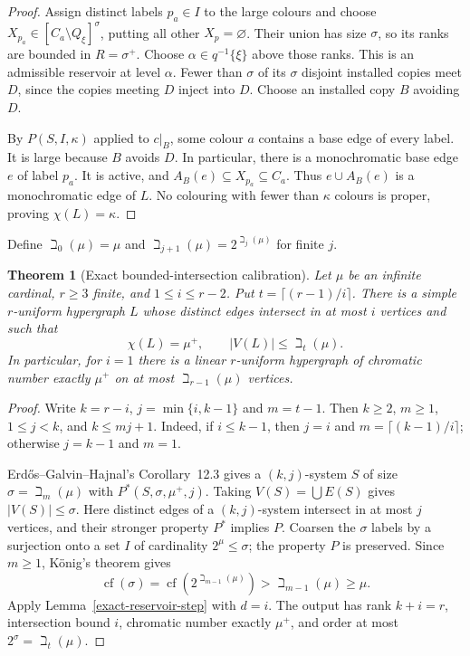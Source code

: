 \documentclass[a4paper,11pt,reqno]{amsart}
\theoremstyle{plain}
\newtheorem{theorem}{Theorem}[section]
\theoremstyle{definition}
\theoremstyle{remark}
\begin{document}
\begin{proof}
Assign distinct labels $p_a\in I$ to the large colours and choose
$X_{p_a}\in[C_a\setminus Q_\xi]^\sigma$, putting all other
$X_p=\varnothing$.  Their union has size $\sigma$, so its ranks
are bounded in $R=\sigma^+$.  Choose
$\alpha\in q^{-1}\{\xi\}$ above those ranks.
This is an admissible reservoir at level $\alpha$.
Fewer than $\sigma$ of its $\sigma$ disjoint installed copies
meet $D$, since the copies meeting $D$ inject into $D$.
Choose an installed copy $B$ avoiding $D$.

By $P(S,I,\kappa)$ applied to $c|_B$, some colour $a$ contains
a base edge of every label.  It is large because $B$ avoids $D$.
In particular, there is a monochromatic base edge $e$ of label
$p_a$.  It is active, and
$A_B(e)\subseteq X_{p_a}\subseteq C_a$.
Thus $e\cup A_B(e)$ is a monochromatic edge of $L$.
No colouring with fewer than $\kappa$ colours is proper, proving
$\chi(L)=\kappa$.
\end{proof}

Define $\beth_0(\mu)=\mu$ and
$\beth_{j+1}(\mu)=2^{\beth_j(\mu)}$ for finite $j$.

\begin{theorem}[Exact bounded-intersection calibration]
\label{exact-bounded-calibration}
Let $\mu$ be an infinite cardinal, $r\ge3$ finite, and
$1\le i\le r-2$.  Put $t=\lceil(r-1)/i\rceil$.
There is a simple $r$-uniform hypergraph $L$ whose distinct edges
intersect in at most $i$ vertices and such that
\[
 \chi(L)=\mu^+,\qquad |V(L)|\le\beth_t(\mu).
\]
In particular, for $i=1$ there is a linear $r$-uniform hypergraph
of chromatic number exactly $\mu^+$ on at most
$\beth_{r-1}(\mu)$ vertices.
\end{theorem}

\begin{proof}
Write $k=r-i$, $j=\min\{i,k-1\}$ and $m=t-1$.
Then $k\ge2$, $m\ge1$, $1\le j<k$, and $k\le mj+1$.
Indeed, if $i\le k-1$, then $j=i$ and
$m=\lceil(k-1)/i\rceil$; otherwise $j=k-1$ and $m=1$.

Erd\H{o}s--Galvin--Hajnal's Corollary~12.3
\citep[p.~485]{egh1975} gives a $(k,j)$-system $S$ of size
$\sigma=\beth_m(\mu)$ with
$P^*(S,\sigma,\mu^+,j)$.
Taking $V(S)=\bigcup E(S)$ gives $|V(S)|\le\sigma$.
Here distinct edges of a $(k,j)$-system intersect in at most $j$
vertices, and their stronger property $P^*$ implies $P$.
Coarsen the $\sigma$ labels by a surjection onto a set $I$ of
cardinality $2^\mu\le\sigma$; the property $P$ is preserved.
Since $m\ge1$, K\"onig's theorem gives
\[
 \operatorname{cf}(\sigma)
 =\operatorname{cf}(2^{\beth_{m-1}(\mu)})
 >\beth_{m-1}(\mu)\ge\mu.
\]
Apply Lemma~\ref{exact-reservoir-step} with $d=i$.
The output has rank $k+i=r$, intersection bound $i$, chromatic
number exactly $\mu^+$, and order at most
$2^\sigma=\beth_t(\mu)$.
\end{proof}
\end{document}
